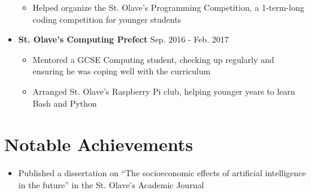 \documentclass[11pt,a4paper,sans]{moderncv}        %
\begin{document}
\begin{itemize}
\begin{itemize}
\vspace{3pt}

\item Helped organize the St. Olave’s Programming Competition, a 1-term-long coding competition for younger
students

\end{itemize}

\vspace{6pt}

\item \textbf{St. Olave’s Computing Prefect} \hfill Sep. 2016 - Feb. 2017

\begin{itemize}

\vspace{3pt}

\item Mentored a GCSE Computing student, checking up regularly and ensuring he was coping well with the curriculum

\vspace{3pt}

\item Arranged St. Olave’s Raspberry Pi club, helping younger years to learn Bash and Python

\end{itemize}

\end{itemize}

\section{Notable Achievements}

\begin{itemize}

\item Published a dissertation on “The socioeconomic effects of artificial intelligence in the future” in the St. Olave’s Academic Journal

\end{itemize}

\nocite{*}



\end{document}
